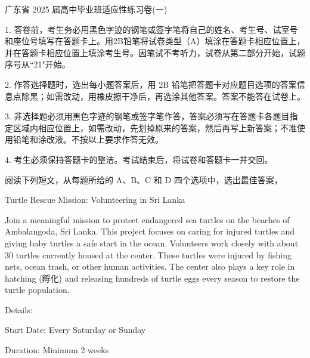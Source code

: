 \documentclass{英语试卷}
\begin{document}
\par 广东省 2025 届高中毕业班适应性练习卷(一)\par
\begin{notice}
\par 1. 答卷前，考生务必用黑色字迹的钢笔或签字笔将自己的姓名、考生号、试室号和座位号填写在答题卡上。用2B铅笔将试卷类型（A）填涂在答题卡相应位置上，并在答题卡相应位置上填涂考生号。因笔试不考听力，试卷从第二部分开始，试题序号从“21"开始。\par
\par 2. 作答选择题时，选出每小题答案后，用 2B 铅笔把答题卡对应题目选项的答案信息点除黑；如需改动，用橡皮擦干净后，再选涂其他答案。答案不能答在试卷上。\par
\par 3. 非选择题必须用黑色字迹的钢笔或签字笔作答，答案必须写在答题卡各题目指定区域内相应位置上，如需改动，先划掉原来的答案，然后再写上新答案；不准使用铅笔和涂改液。不按以上要求作答无效。\par
\par 4. 考生必须保持答题卡的整洁。考试结束后，将试卷和答题卡一并交回。\par
\end{notice}
\par 阅读下列短文，从每题所给的 A、B、C 和 D 四个选项中，选出最佳答案，\par
{}
\par Turtle Rescue Mission: Volunteering in Sri Lanka\par
\par Join a meaningful mission to protect endangered sea turtles on the beaches of Ambalangoda, Sri Lanka. This project focuses on caring for injured turtles and giving baby turtles a safe start in the ocean. Volunteers work closely with about 30 turtles currently housed at the center. These turtles were injured by fishing nets, ocean trash, or other human activities. The center also plays a key role in hatching (孵化) and releasing hundreds of turtle eggs every season to restore the turtle population.\par
\par Details:\par
\par Start Date: Every Saturday or Sunday\par
\par Duration: Minimum 2 weeks\par
\end{document}
